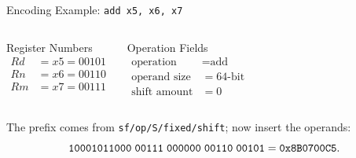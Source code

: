 \documentclass[aspectratio=169,11pt,t]{beamer}
\newcommand{\bits}[1]{\texttt{#1}}
\newcommand{\hex}[1]{\texttt{0x#1}}
\newcommand{\code}[1]{\texttt{#1}}
\newcommand{\bfld}[5]{%
  \pgfmathsetmacro{\cx}{#1 + #3/2}%
  \fill[#5] (#1,#2) rectangle ++(#3,0.72);%
  \draw[navy,line width=0.7pt] (#1,#2) rectangle ++(#3,0.72);%
  \node[font=\scriptsize\ttfamily,text height=1.5ex,text depth=0.35ex,align=center,text=darkgray] at (\cx,#2+0.36) {#4};%
}
\begin{document}
\begin{frame}{Encoding Example: \texttt{add x5, x6, x7}}

\begin{columns}[T,onlytextwidth]

\begin{block}{Register Numbers}
\[
\begin{aligned}
Rd &= x5 = 00101 \\
Rn &= x6 = 00110 \\
Rm &= x7 = 00111
\end{aligned}
\]
\end{block}

\begin{block}{Operation Fields}
\[
\begin{aligned}
\text{operation} &= \text{add} \\
\text{operand size} &= 64\text{-bit} \\
\text{shift amount} &= 0
\end{aligned}
\]
\end{block}

\end{columns}

\vspace{0.2cm}

\begin{center}
\end{center}

\vspace{0.1cm}

\centering
The prefix comes from \code{sf/op/S/fixed/shift}; now insert the operands:
\[
\bits{10001011000\;00111\;000000\;00110\;00101}
= \hex{8B0700C5}.
\]

\end{frame}

\end{document}
